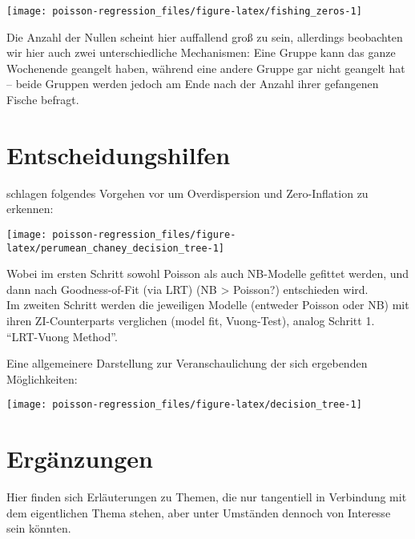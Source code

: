 \documentclass[ngerman,a4paper,]{scrartcl}
\theoremstyle{definition}
\theoremstyle{definition}
\theoremstyle{definition}
\theoremstyle{remark}
\begin{document}
\begin{center}\texttt{[image: poisson-regression\_files/figure-latex/fishing\_zeros-1]} \end{center}

Die Anzahl der Nullen scheint hier auffallend groß zu sein, allerdings beobachten wir hier auch zwei unterschiedliche Mechanismen: Eine Gruppe kann das ganze Wochenende geangelt haben, während eine andere Gruppe gar nicht geangelt hat -- beide Gruppen werden jedoch am Ende nach der Anzahl ihrer gefangenen Fische befragt.

\hypertarget{entscheidungshilfen}{%
\section{Entscheidungshilfen}\label{entscheidungshilfen}}

\citet{perumean-chaneyZeroinflatedOverdispersedWhat2013} schlagen folgendes Vorgehen vor um Overdispersion und Zero-Inflation zu erkennen:

\begin{center}\texttt{[image: poisson-regression\_files/figure-latex/perumean\_chaney\_decision\_tree-1]} \end{center}

Wobei im ersten Schritt sowohl Poisson als auch NB-Modelle gefittet werden, und dann nach Goodness-of-Fit (via LRT) (NB \textgreater{} Poisson?) entschieden wird.\\
Im zweiten Schritt werden die jeweiligen Modelle (entweder Poisson oder NB) mit ihren ZI-Counterparts verglichen (model fit, Vuong-Test), analog Schritt 1.\\
\enquote{LRT-Vuong Method}.

Eine allgemeinere Darstellung zur Veranschaulichung der sich ergebenden Möglichkeiten:

\begin{center}\texttt{[image: poisson-regression\_files/figure-latex/decision\_tree-1]} \end{center}

\hypertarget{appendix-appendix}{%
\appendix {}}


\hypertarget{erganzungen}{%
\section{Ergänzungen}\label{erganzungen}}

Hier finden sich Erläuterungen zu Themen, die nur tangentiell in Verbindung mit dem eigentlichen Thema stehen, aber unter Umständen dennoch von Interesse sein könnten.
\end{document}
